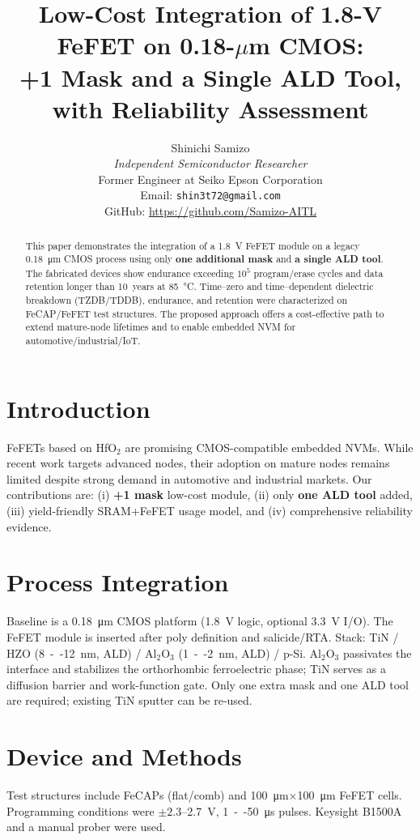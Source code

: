 \documentclass[conference]{IEEEtran}
\title{Low-Cost Integration of 1.8-V FeFET on 0.18-\(\mu\)m CMOS:\\
+1 Mask and a Single ALD Tool, with Reliability Assessment}
\author{%
Shinichi Samizo\\
\emph{Independent Semiconductor Researcher}\\
Former Engineer at Seiko Epson Corporation\\
Email: \texttt{shin3t72@gmail.com}\\
GitHub: \url{https://github.com/Samizo-AITL}
}
\begin{document}
\maketitle

\begin{abstract}
This paper demonstrates the integration of a \SI{1.8}{V} FeFET module on a legacy \SI{0.18}{\micro m} CMOS process using only \textbf{one additional mask} and \textbf{a single ALD tool}. 
The fabricated devices show endurance exceeding \(10^{5}\) program/erase cycles and data retention longer than 10~years at \SI{85}{\celsius}. 
Time--zero and time--dependent dielectric breakdown (TZDB/TDDB), endurance, and retention were characterized on FeCAP/FeFET test structures. 
The proposed approach offers a cost-effective path to extend mature-node lifetimes and to enable embedded NVM for automotive/industrial/IoT.
\end{abstract}

\section{Introduction}
FeFETs based on HfO\(_2\) are promising CMOS-compatible embedded NVMs. 
While recent work targets advanced nodes, their adoption on mature nodes remains limited despite strong demand in automotive and industrial markets. 
Our contributions are: (i) \textbf{+1 mask} low-cost module, (ii) only \textbf{one ALD tool} added, (iii) yield-friendly SRAM+FeFET usage model, and (iv) comprehensive reliability evidence.

\section{Process Integration}
Baseline is a \SI{0.18}{\micro m} CMOS platform (\SI{1.8}{V} logic, optional \SI{3.3}{V} I/O). 
The FeFET module is inserted after poly definition and salicide/RTA. 
Stack: TiN / HZO (\SI{8}{--}\SI{12}{nm}, ALD) / Al\(_2\)O\(_3\) (\SI{1}{--}\SI{2}{nm}, ALD) / p-Si. 
Al\(_2\)O\(_3\) passivates the interface and stabilizes the orthorhombic ferroelectric phase; TiN serves as a diffusion barrier and work-function gate. 
Only one extra mask and one ALD tool are required; existing TiN sputter can be re-used.

\section{Device and Methods}
Test structures include FeCAPs (flat/comb) and \SI{100}{\micro m}\(\times\)\SI{100}{\micro m} FeFET cells.
Programming conditions were \(\pm 2.3\)--\SI{2.7}{V}, \SI{1}{--}\SI{50}{\micro s} pulses. 
Keysight B1500A and a manual prober were used.
\end{document}
